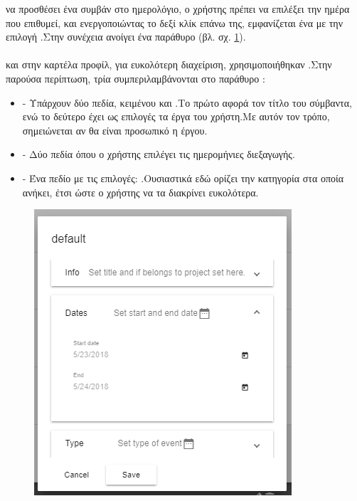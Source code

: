  να προσθέσει ένα συμβάν στο ημερολόγιο, ο χρήστης πρέπει να επιλέξει την ημέρα που επιθυμεί, και ενεργοποιώντας το δεξί κλίκ επάνω της, εμφανίζεται ένα  με την επιλογή .Στην συνέχεια ανοίγει ένα  παράθυρο (βλ. σχ. \ref{fig:userCalendarCreateEvent}).\\ \\
 και στην καρτέλα προφίλ, για ευκολότερη διαχείριση, χρησιμοποιήθηκαν .Στην παρούσα περίπτωση, τρία  συμπεριλαμβάνονται στο παράθυρο :\\
\begin{itemize}
	\item {} - Υπάρχουν δύο πεδία, κειμένου και .Το πρώτο αφορά τον τίτλο του σύμβαντα, ενώ το δεύτερο έχει ως επιλογές τα έργα του χρήστη.Με αυτόν τον τρόπο, σημειώνεται αν θα είναι προσωπικό η έργου.
	\item {} - Δύο πεδία όπου ο χρήστης επιλέγει τις ημερομήνιες διεξαγωγής.
	\item {} - Ένα πεδίο  με τις επιλογές: .Ουσιαστικά εδώ ορίζει την κατηγορία στα οποία ανήκει, έτσι ώστε ο χρήστης να τα διακρίνει ευκολότερα. 
\end{itemize}

\begin{figure}[!htb]
\centering
\includegraphics[scale=0.8]{images/userCalendarCreateEvent.png}
\caption{}
\label{fig:userCalendarCreateEvent}
\end{figure}

